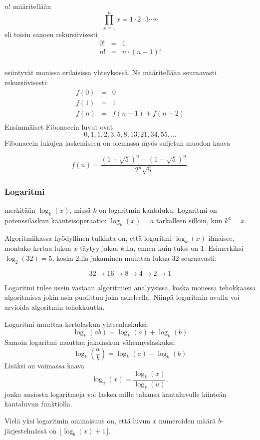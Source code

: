 
\noindent
{} $n!$ määritellään
\[\prod_{x=1}^n x = 1 \cdot 2 \cdot 3 \cdots n\]
eli toisin sanoen rekursiivisesti
\[
\begin{array}{lcl}
0! & = & 1 \\
n! & = & n \cdot (n-1)! \\
\end{array}
\]


\noindent
{} esiintyvät monissa erilaisissa yhteyksissä.
Ne määritellään seuraavasti rekursiivisesti:
\[
\begin{array}{lcl}
f(0) & = & 0 \\
f(1) & = & 1 \\
f(n) & = & f(n-1)+f(n-2) \\
\end{array}
\]
Ensimmäiset Fibonaccin luvut ovat
\[0, 1, 1, 2, 3, 5, 8, 13, 21, 34, 55, \ldots\]
Fibonaccin lukujen laskemiseen on olemassa myös
suljetun muodon kaava

\[f(n)=\frac{(1 + \sqrt{5})^n - (1-\sqrt{5})^n}{2^n \sqrt{5}}.\]

\subsubsection{Logaritmi}


 merkitään $\log_k(x)$, missä $k$ on logaritmin kantaluku.
Logaritmi on potenssilaskun käänteisoperaatio:
$\log_k(x)=a$ tarkalleen silloin, kun $k^a=x$.

Algoritmiikassa hyödyllinen tulkinta on,
että logaritmi $\log_k(x)$ ilmaisee, montako kertaa lukua $x$
täytyy jakaa $k$:lla, ennen kuin tulos on 1.
Esimerkiksi $\log_2(32)=5$, koska 2:lla jakaminen
muuttaa lukua 32 seuraavasti:

\[32 \rightarrow 16 \rightarrow 8 \rightarrow 4 \rightarrow 2 \rightarrow 1 \]

Logaritmi tulee usein vastaan algoritmien analyysissa,
koska monessa tehokkaassa algoritmissa jokin asia puolittuu
joka askeleella.
Niinpä logaritmin avulla voi arvioida algoritmin tehokkuutta.

Logaritmi muuttaa kertolaskun yhteenlaskuksi:
\[\log_k(ab) = \log_k(a)+\log_k(b)\]
Samoin logaritmi muuttaa jakolaskun vähennyslaskuksi:
\[\log_k(\frac{a}{b}) = \log_k(a)-\log_k(b)\]
Lisäksi on voimassa kaava
\[\log_u(x) = \frac{\log_k(x)}{\log_k(u)},\]
jonka ansiosta logaritmeja voi laskea mille tahansa kantaluvulle
kiinteän kantaluvun funktiolla.

Vielä yksi logaritmin ominaisuus on, että
luvun $x$ numeroiden määrä $b$-järjestelmässä
on $\lfloor \log_b(x)+1 \rfloor$.

